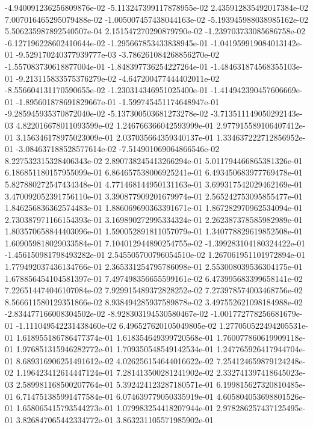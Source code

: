 -4.940091236256809876e-02
-5.113247399117878955e-02
2.435912835492017384e-02
7.007016465295079488e-02
-1.005007457438044163e-02
-5.193945988038985162e-02
5.506235987892540507e-04
2.151547270290879790e-02
-1.239703733085686758e-02
-6.127196228602410644e-02
-1.295667853433838945e-01
-1.041959919084013142e-01
-9.529170240377939777e-03
-3.786261084268856270e-02
-1.557083730618877004e-01
-1.848397736254227264e-01
-1.484631874568355103e-01
-9.213115833575376279e-02
-4.647200477444402011e-02
-8.556604131170590655e-02
-1.230314346951025400e-01
-1.414942390457606669e-01
-1.895601878691829667e-01
-1.599745451174648947e-01
-9.285945935370872040e-02
-5.137300503681273278e-02
-3.713511149050292143e-03
4.822016678011093599e-02
1.246766366042593999e-01
2.977915589106407412e-01
3.156346178975023009e-01
2.037035664359340137e-01
1.334637222712856952e-01
-3.084637188528577614e-02
-7.514901069064866546e-02
8.227532315328406343e-02
2.890738245413266294e-01
5.011794466865381326e-01
6.186851180157955099e-01
6.864657538006925241e-01
6.493450683977769478e-01
5.827880272547434348e-01
4.771468144950131163e-01
3.699317542029462169e-01
3.470092052391756110e-01
3.390877909201679974e-01
2.565242753095855477e-01
1.846256836362574483e-01
1.886069690363391671e-01
1.867282970962534094e-01
2.730387971166154393e-01
3.169890272995334324e-01
2.262387378585982989e-01
1.803570658844403096e-01
1.590052891811057079e-01
1.340778829619852508e-01
1.609059818029033584e-01
7.104012944890254755e-02
-1.399283104180324422e-01
-1.456150981798493282e-01
2.545505700796054510e-02
1.267061951101972894e-01
1.779492037436134766e-01
2.365331254795786098e-01
2.553008039536304175e-01
1.678856454104581397e-01
7.497498356655599161e-02
6.473995683399658141e-02
7.226514474046107084e-02
7.929915489372828252e-02
7.273978574003468756e-02
8.566611580129351866e-02
8.938494285937589878e-02
3.497552621098184988e-02
-2.834477166008304502e-02
-8.928303194530580467e-02
-1.001772778256681679e-01
-1.111049542231438460e-02
6.496527620105049805e-02
1.277050522494205531e-01
1.618955186786477374e-01
1.618354649399720568e-01
1.760077860619909118e-01
1.976851315946282772e-01
1.709350548549142534e-01
1.247765926417944704e-01
8.689316906251491612e-02
4.026256154644016622e-02
7.254124659879124248e-02
1.196423412614447124e-01
7.281413500281241902e-02
2.332741397418645023e-03
2.589981168500207764e-01
5.392424123287180571e-01
6.199815627320810485e-01
6.714751385991477584e-01
6.074639779050335919e-01
4.605804053698801526e-01
1.658065415793544273e-01
1.079983254418207944e-01
2.978286257437125495e-01
3.826847065442334772e-01
3.863231105571985902e-01
